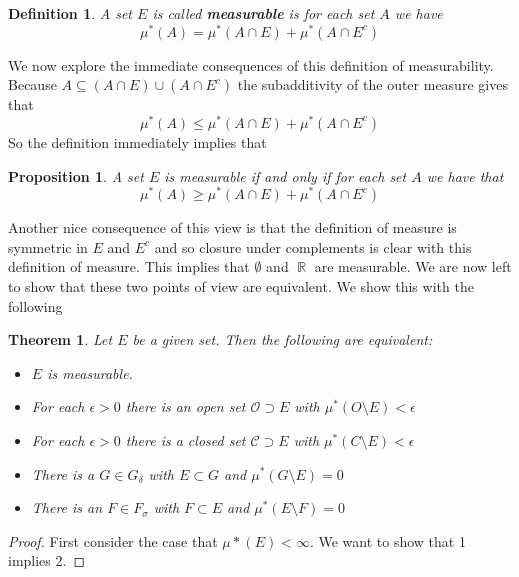 \documentclass{article}
\DeclareMathOperator{\R}{\mathbb{R}}
\newtheorem*{thm}{Theorem}
\newtheorem*{defn}{Definition}
\newtheorem*{prop}{Proposition}
\begin{document}
\begin{defn}
 A set $E$ is called {\bf measurable} is for each set $A$ we have
\[
\mu^*(A) = \mu^*(A\cap E) + \mu^*(A\cap E^c)
\]
\end{defn}

We now explore the immediate consequences of this definition of measurability. Because $A \subseteq (A \cap E) \cup (A\cap E^c)$ the subadditivity of the outer measure gives that 
\[
\mu^*(A) \leq \mu^*(A \cap E) + \mu^*(A\cap E^c)
\]
So the definition immediately implies that \\
\begin{prop}
A set $E$ is measurable if and only if for each set $A$ we have that 
\[
\mu^*(A) \geq \mu^*(A \cap E) + \mu^*(A\cap E^c)
\]
\end{prop}
\indent Another nice consequence of this view is that the definition of measure is symmetric in $E$ and $E^c$ and so closure under complements is clear with this definition of measure. This implies that $\emptyset$ and $\R$ are measurable.  We are now left to show that these two points of view are equivalent. We show this with the following \\
\begin{thm}
Let $E$ be a given set. Then the following are equivalent:
\begin{itemize}
\item[1)] $E$ is measurable. 
\item[2)] For each $\epsilon > 0$ there is an open set $\mathcal{O} \supset E$ with $\mu^*(O\setminus E) < \epsilon$
\item[3)] For each $\epsilon > 0$ there is a closed set $\mathcal{C} \supset E$ with $\mu^*(C\setminus E) < \epsilon$
\item[4)] There is a $G \in G_\delta$ with $E \subset G$ and $\mu^*(G\setminus E) = 0$
\item[5)] There is an $F \in F_\sigma$ with $F \subset E$ and $\mu^*(E\setminus F) = 0$
\end{itemize}
\end{thm}
\begin{proof}
First consider the case that $\mu*(E) < \infty$. We want to show that 1 implies 2. 
\end{proof}
\end{document}
